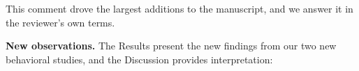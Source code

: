 This comment drove the largest additions to the manuscript, and we answer it in the reviewer's own terms.

\textbf{New observations.} The Results present the new findings from our two new behavioral studies, and the Discussion provides interpretation:

%
